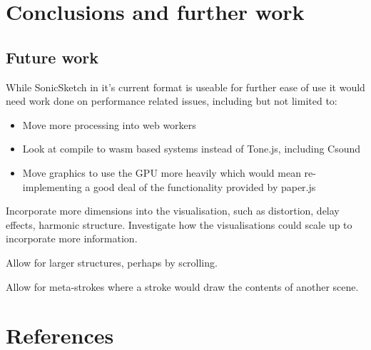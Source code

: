 \documentclass[a4paper,12pt]{article}
\begin{document}
\section{Conclusions and further work}
\label{sec:org3559ffc}
\subsection{Future work}
\label{sec:org3ea7f34}
While SonicSketch in it's current format is useable for further ease of use it
would need work done on performance related issues, including but not limited
to: 
\begin{itemize}
\item Move more processing into web workers
\item Look at compile to wasm based systems instead of Tone.js, including Csound
\item Move graphics to use the GPU more heavily which would mean re-implementing a
good deal of the functionality provided by paper.js
\end{itemize}

Incorporate more dimensions into the visualisation, such as distortion, delay
effects, harmonic structure. Investigate how the visualisations could scale up
to incorporate more information.

Allow for larger structures, perhaps by scrolling.

Allow for meta-strokes where a stroke would draw the contents of another scene.

\section{References}
\label{sec:orgc0a1a79}
\end{document}
